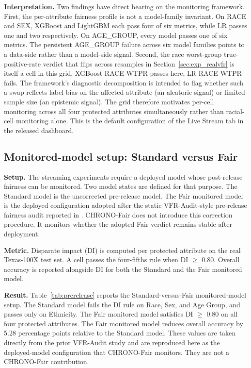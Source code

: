 \documentclass[acmsmall,nonacm,review,anonymous]{acmart}
\newcommand{\1}[1]{\mathbf{1}\!\left\{#1\right\}}
\begin{document}
\textbf{Interpretation.}
Two findings have direct bearing on the monitoring framework. First, the per-attribute fairness profile is not a model-family invariant. On RACE and SEX, XGBoost and LightGBM each pass four of six metrics, while LR passes one and two respectively. On AGE\_GROUP, every model passes one of six metrics. The persistent AGE\_GROUP failure across six model families points to a data-side rather than a model-side signal. Second, the race worst-group true-positive-rate verdict that flips across resamples in Section~\ref{sec:exp_realvfr} is itself a cell in this grid. XGBoost RACE WTPR passes here, LR RACE WTPR fails. The framework's diagnostic decomposition is intended to flag whether such a swap reflects label bias on the affected attribute (an aleatoric signal) or limited sample size (an epistemic signal). The grid therefore motivates per-cell monitoring across all four protected attributes simultaneously rather than racial-cell monitoring alone. This is the default configuration of the Live Stream tab in the released dashboard.

\subsection{Monitored-model setup: Standard versus Fair}\label{sec:exp_prerelease}

\textbf{Setup.}
The streaming experiments require a deployed model whose post-release fairness can be monitored. Two model states are defined for that purpose. The Standard model is the uncorrected pre-release model. The Fair monitored model is the deployed configuration adopted after the static VFR-Audit-style pre-release fairness audit reported in \cite{joy2025vfr}. CHRONO-Fair does not introduce this correction procedure. It monitors whether the adopted Fair verdict remains stable after deployment.

\textbf{Metric.}
Disparate impact (DI) is computed per protected attribute on the real Texas-100X test set. A cell passes the four-fifths rule when DI $\geq$ 0.80. Overall accuracy is reported alongside DI for both the Standard and the Fair monitored model.

\textbf{Result.}
Table~\ref{tab:prerelease} reports the Standard-versus-Fair monitored-model setup. The Standard model fails the DI rule on Race, Sex, and Age Group, and passes only on Ethnicity. The Fair monitored model satisfies DI $\geq$ 0.80 on all four protected attributes. The Fair monitored model reduces overall accuracy by 5.28 percentage points relative to the Standard model. These values are taken directly from the prior VFR-Audit study \cite{joy2025vfr} and are reproduced here as the deployed-model configuration that CHRONO-Fair monitors. They are not a CHRONO-Fair contribution.
\end{document}
